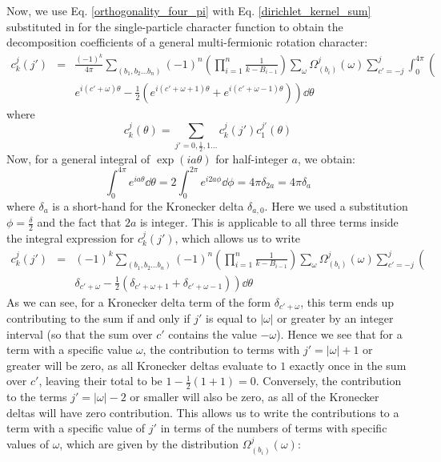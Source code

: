 \documentclass[12pt]{article}
\begin{document}
	Now, we use Eq. \ref{orthogonality_four_pi} with Eq. \ref{dirichlet_kernel_sum} substituted in for the single-particle character function to obtain the decomposition coefficients of a general multi-fermionic rotation character:
	\begin{eqnarray*}
	c^j_k(j')&=&\frac{(-1)^k}{4\pi}\sum_{(b_1, b_2\dots b_n)}(-1)^n\left(\prod_{i=1}^n \frac{1}{k-B_{i-1}}\right)\sum_{\omega}\Omega^j_{(b_i)}(\omega)\sum_{c'=-j}^j\int_0^{4\pi}\left(\right.\\
	&&\left. e^{i(c'+\omega)\theta}-\frac{1}{2}\left(e^{i(c'+\omega + 1)\theta}+e^{i(c'+\omega -1)\theta}\right) \right)\dd\theta
	\end{eqnarray*}
	where
	\begin{equation}
	c^j_k(\theta)=\sum_{j'=0,\frac{1}{2},1\dots}c^j_k(j')c^{j'}_1(\theta)
	\end{equation}
	Now, for a general integral of $\exp(ia\theta)$ for half-integer $a$, we obtain:
	\begin{equation}
	\int_0^{4\pi}e^{ia\theta}\dd\theta=2\int_0^{2\pi}e^{i2a\phi}\dd\phi=4\pi\delta_{2a}=4\pi\delta_a
	\end{equation}
	where $\delta_a$ is a short-hand for the Kronecker delta $\delta_{a,0}$. Here we used a substitution $\phi=\frac{\delta}{2}$ and the fact that $2a$ is integer. This is applicable to all three terms inside the integral expression for $c^j_k(j')$, which allows us to write
	\begin{eqnarray*}
	c^j_k(j')&=&(-1)^k\sum_{(b_1, b_2\dots b_n)}(-1)^n\left(\prod_{i=1}^n \frac{1}{k-B_{i-1}}\right)\sum_{\omega}\Omega^j_{(b_i)}(\omega)\sum_{c'=-j}^j\left(\right.\\
	&&\left. \delta_{c'+\omega}-\frac{1}{2}\left(\delta_{c'+\omega + 1}+\delta_{c'+\omega -1}\right) \right)\dd\theta
	\end{eqnarray*}
	As we can see, for a Kronecker delta term of the form $\delta_{c'+\omega}$, this term ends up contributing to the sum if and only if $j'$ is equal to $|\omega|$ or greater by an integer interval (so that the sum over $c'$ contains the value $-\omega$). Hence we see that for a term with a specific value $\omega$, the contribution to terms with $j'=|\omega|+1$ or greater will be zero, as all Kronecker deltas evaluate to $1$ exactly once in the sum over $c'$, leaving their total to be $1-\frac{1}{2}(1+1)=0$. Conversely, the contribution to the terms $j'=|\omega|-2$ or smaller will also be zero, as all of the Kronecker deltas will have zero contribution. This allows us to write the contributions to a term with a specific value of $j'$ in terms of the numbers of terms with specific values of $\omega$, which are given by the distribution $\Omega^j_{(b_i)}(\omega)$:
\end{document}
